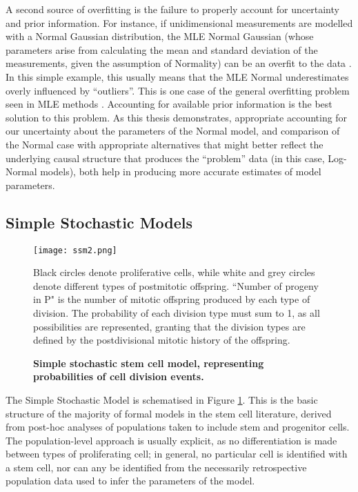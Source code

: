 A second source of overfitting is the failure to properly account for uncertainty and prior information. For instance, if unidimensional measurements are modelled with a Normal Gaussian distribution, the MLE Normal Gaussian (whose parameters arise from calculating the mean and standard deviation of the measurements, given the assumption of Normality) can be an overfit to the data \cite[p.28]{Bishop2006}. In this simple example, this usually means that the MLE Normal underestimates overly influenced by ``outliers''. This is one case of the general overfitting problem seen in MLE methods \cite{Green2017}. Accounting for available prior information is the best solution to this problem. As this thesis demonstrates, appropriate accounting for our uncertainty about the parameters of the Normal model, and comparison of the Normal case with appropriate alternatives that might better reflect the underlying causal structure that produces the ``problem'' data (in this case, Log-Normal models), both help in producing more accurate estimates of model parameters.
 
\subsection{Simple Stochastic Models}
\label{ssec:SSM}

\begin{figure}
\texttt{[image: ssm2.png]}
\centering
\caption{{\bf Simple stochastic stem cell model, representing probabilities of cell division events.}} Black circles denote proliferative cells, while white and grey circles denote different types of postmitotic offspring. ``Number of progeny in P" is the number of mitotic offspring produced by each type of division. The probability of each division type must sum to 1, as all possibilities are represented, granting that the division types are defined by the postdivisional mitotic history of the offspring.
\label{fig:SSM}
\end{figure}

The Simple Stochastic Model is schematised in Figure \ref{fig:SSM}. This is the basic structure of the majority of formal models in the stem cell literature, derived from post-hoc analyses of populations taken to include stem and progenitor cells. The population-level approach is usually explicit, as no differentiation is made between types of proliferating cell; in general, no particular cell is identified with a stem cell, nor can any be identified from the necessarily retrospective population data used to infer the parameters of the model. 

